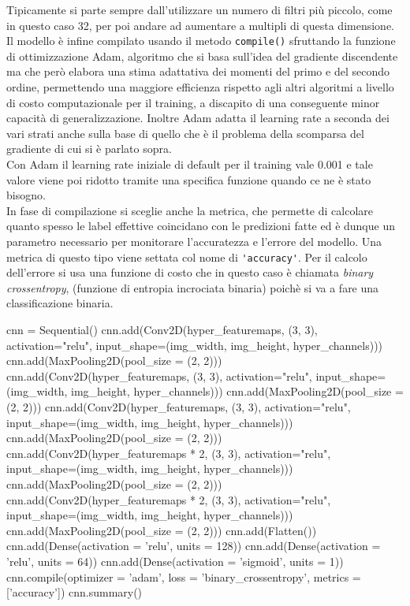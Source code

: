 Tipicamente si parte sempre dall’utilizzare un numero di filtri più piccolo, come in questo caso 32,
 per poi andare ad aumentare a multipli di questa dimensione. 
Il modello è infine compilato usando il metodo \lstinline{compile()} sfruttando la funzione di ottimizzazione Adam, 
algoritmo che si
 basa sull’idea del gradiente discendente ma che però elabora una stima adattativa dei momenti 
 del primo e del secondo ordine, permettendo una maggiore efficienza rispetto agli altri algoritmi
  a livello di costo computazionale per il training, a discapito di una conseguente minor capacità
   di generalizzazione. Inoltre Adam adatta il learning rate a seconda dei vari strati anche sulla base
    di quello che è il problema della scomparsa del gradiente di cui si è parlato sopra.  \\
    Con Adam il learning rate iniziale di default per il training vale 0.001 e tale valore viene poi ridotto tramite una specifica funzione quando ce ne è stato bisogno.\\
In fase di compilazione si sceglie anche la metrica, che permette di calcolare quanto spesso le label effettive
 coincidano con
 le predizioni fatte ed è dunque un parametro necessario per monitorare l’accuratezza e l’errore del modello.
  Una metrica di questo tipo viene settata col nome di \lstinline{'accuracy'}. 
  Per il calcolo dell’errore si usa una funzione di costo che in questo caso è chiamata \emph{binary crossentropy},
   (funzione di entropia incrociata binaria) poichè si va a fare una classificazione binaria.\\


   
    
\begin{python} %
cnn = Sequential()
cnn.add(Conv2D(hyper_featuremaps, (3, 3), activation="relu", input_shape=(img_width, img_height, hyper_channels)))
cnn.add(MaxPooling2D(pool_size = (2, 2)))
cnn.add(Conv2D(hyper_featuremaps, (3, 3), activation="relu", input_shape=(img_width, img_height, hyper_channels)))
cnn.add(MaxPooling2D(pool_size = (2, 2)))
cnn.add(Conv2D(hyper_featuremaps, (3, 3), activation="relu", input_shape=(img_width, img_height, hyper_channels)))
cnn.add(MaxPooling2D(pool_size = (2, 2)))
cnn.add(Conv2D(hyper_featuremaps * 2, (3, 3), activation="relu", input_shape=(img_width, img_height, hyper_channels)))
cnn.add(MaxPooling2D(pool_size = (2, 2)))
cnn.add(Conv2D(hyper_featuremaps * 2, (3, 3), activation="relu", input_shape=(img_width, img_height, hyper_channels)))
cnn.add(MaxPooling2D(pool_size = (2, 2)))
cnn.add(Flatten())
cnn.add(Dense(activation = 'relu', units = 128))
cnn.add(Dense(activation = 'relu', units = 64))
cnn.add(Dense(activation = 'sigmoid', units = 1))
cnn.compile(optimizer = 'adam', loss = 'binary_crossentropy', metrics = ['accuracy'])
cnn.summary()

\end{python}
\begin{lstlisting}[caption= {Modello in Python utilizzato} ]
\end{lstlisting}

